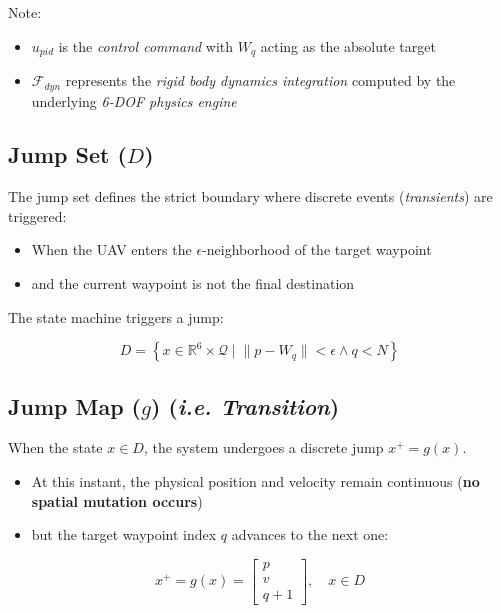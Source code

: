 \documentclass{article}
\begin{document}
Note:
\begin{itemize}
  \item $u_{pid}$ is the \textit{control command} with $W_q$ acting as the absolute target
  \item $\mathcal{F}_{dyn}$ represents the \textit{rigid body dynamics integration} computed by the underlying \textit{6-DOF physics engine}
\end{itemize}

\subsection{Jump Set ($D$)}

The jump set defines the strict boundary where discrete events (\textit{transients})  are triggered:
\begin{itemize}
  \item When the UAV enters the $\epsilon$-neighborhood of the target waypoint
  \item and the current waypoint is not the final destination
\end{itemize}

The state machine triggers a jump:

\begin{equation}
  D = \left\lbrace x \in \mathbb{R}^6 \times \mathcal{Q} \mid \lVert p - W_q \rVert < \epsilon \land q < N \right\rbrace
\end{equation}

\subsection{Jump Map ($g$) (\textit{i.e. Transition})}

When the state $x\in D$, the system undergoes a discrete jump $x^+=g(x)$. 
\begin{itemize}
  \item At this instant, the physical position and velocity remain continuous (\textbf{no spatial mutation occurs})
  \item but the target waypoint index $q$ advances to the next one:
\end{itemize}

\begin{equation}
x^+=g(x)=\begin{bmatrix}p\\v\\q+1\end{bmatrix},\quad x\in D
\end{equation}
\end{document}
